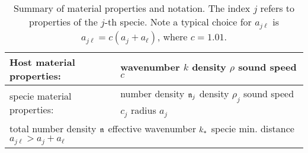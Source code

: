 \begin{table}[h]
\centering
\begin{tabular}{|l| l|}
  \hline
Host material properties: &  wavenumber $k$ \hspace{0.8cm} density $\rho$  \hspace{0.25cm} sound speed $c$
\\ \hline
specie material properties: & number density $\mathfrak n_{j}$ \hspace{0.1cm} density $\rho_j $
\hspace{0.1cm} sound speed $c_j$  \hspace{0.1cm} radius $a_j$
\\\hline
\multicolumn{2}{|l|}{
  total number density $\mathfrak n_{}$   \hspace{0.2cm}  effective wavenumber $k_*$ \hspace{0.2cm} specie min. distance $a_{j\ell} > a_j + a_\ell$
}
\\\hline
\end{tabular}
\label{tab:properties}
\caption{Summary of material properties and notation. The index $j$ refers to properties of the $j$-th specie. Note a typical choice for $a_{j\ell}$ is $a_{j\ell} = c (a_j + a_\ell)$, where $c=1.01$.}
\end{table}
